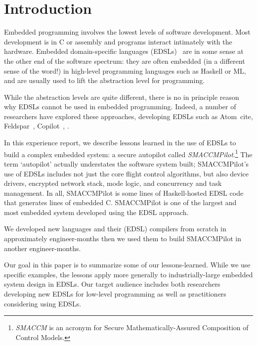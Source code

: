 \section{Introduction}

Embedded programming involves the lowest levels of software development.  Most
development is in C or assembly and programs interact intimately with the
hardware.  Embedded domain-specific languages (EDSLs)~\cite{} are in some sense
at the other end of the software spectrum: they are often embedded (in a
different sense of the word!) in high-level programming languages such as
Haskell or ML, and are usually used to lift the abstraction level for
programming.

While the abstraction levels are quite different, there is no in principle
reason why EDSLs cannot be used in embedded programming.  Indeed, a number of
researchers have explored these approaches, developing EDSLs such as
Atom~cite{}, Feldspar~\cite{}, Copilot~\cite{}, .

In this experience report, we describe lessons learned in the use of EDSLs to
build a complex embedded system: a secure autopilot called
\emph{SMACCMPilot}.\footnote{\emph{SMACCM} is an acronym for Secure
  Mathematically-Assured Composition of Control Models.} The term `autopilot'
actually understates the software system built; SMACCMPilot's use of EDSLs
includes not just the core flight control algorithms, but also device drivers,
encrypted network stack, mode logic, and concurrency and task management.  In
all, SMACCMPilot is some  lines of Haskell-hosted EDSL code that
generates  lines of embedded C.  SMACCMPilot is one of the largest and
most embedded system developed using the EDSL approach. 

We developed new languages and their (EDSL) compilers from scratch in
approximately  engineer-months then we used them to build SMACCMPilot
in another  engineer-months.

Our goal in this paper is to summarize some of our lessons-learned.  While we
use specific examples, the lessons apply more generally to industrially-large
embedded system design in EDSLs.  Our target audience includes both researchers
developing new EDSLs for low-level programming as well as practitioners
considering using EDSLs.
